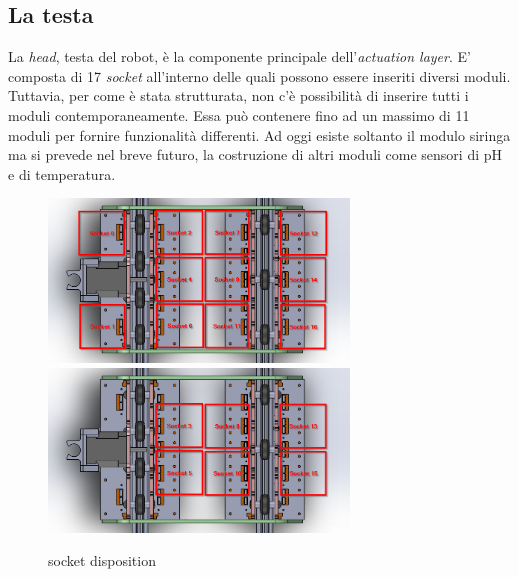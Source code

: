 \subsection{La testa}
La \emph{head}, testa del robot, è la componente principale dell'\emph{actuation layer}. E' composta di 17 \emph{socket} all'interno delle quali possono essere inseriti diversi moduli. Tuttavia, per come è stata strutturata, non c'è possibilità di inserire tutti i moduli contemporaneamente. Essa può contenere fino ad un massimo di 11 moduli per fornire funzionalità differenti. Ad oggi esiste soltanto il modulo siringa ma si prevede nel breve futuro, la costruzione di altri moduli come sensori di pH e di temperatura. 
	\begin{figure}[h]
	\centering
   		{\includegraphics[width=8cm]{immagini/head_sockets_1.png}}
 	\hspace{5mm}
   		{\includegraphics[width=8cm]{immagini/head_sockets.png}}
	\caption{socket disposition}
 	\end{figure}


